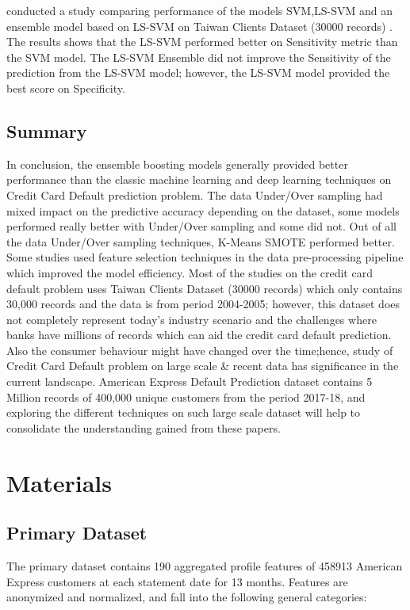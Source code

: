 \documentclass[twoside,11pt,a4paper]{article}
\begin{document}
\citep{lawi2018classification} conducted a study comparing performance of the models \acs{SVM},\acf{LS-SVM} \citep{suykens1999least}  and an ensemble model based on \acs{LS-SVM}  on Taiwan Clients Dataset (30000 records) \citep{yeh2009comparisons}. The results shows that the \acs{LS-SVM} performed better on Sensitivity metric than the \acs{SVM} model. The \acs{LS-SVM} Ensemble did not improve the Sensitivity of the prediction from the \acs{LS-SVM} model; however, the \acs{LS-SVM} model provided the best score on Specificity. \\

\subsection{Summary}
In conclusion, the ensemble boosting models generally provided better performance than the classic machine learning and deep learning techniques on Credit Card Default prediction problem. The data Under/Over sampling had mixed impact on the predictive accuracy depending on the dataset, some models performed really better with Under/Over sampling and some did not. Out of all the data Under/Over sampling techniques, K-Means \acs{SMOTE} performed better. Some studies used feature selection techniques in the data pre-processing pipeline which improved the model efficiency. Most of the studies on the credit card default problem uses Taiwan Clients Dataset (30000 records) \citep{yeh2009comparisons} which only contains 30,000 records and the data is from period 2004-2005; however, this dataset does not completely represent today's industry scenario and the challenges where banks have millions of records which can aid the credit card default prediction. Also the consumer behaviour might have changed over the time;hence, study of Credit Card Default problem on large scale \& recent data has significance in the current landscape. American Express Default Prediction  dataset \citep{amex-default-prediction-dataset} contains 5 Million records of 400,000 unique customers from the period 2017-18, and exploring the different techniques on such large scale dataset will help to consolidate the understanding gained from these papers.

\vfill
\clearpage
\section{Materials}\label{sec:materials}

\subsection{Primary Dataset}
The primary dataset contains 190 aggregated profile features of 458913 American Express customers at each statement date for 13 months. Features are anonymized and normalized, and fall into the following general categories:
\end{document}
